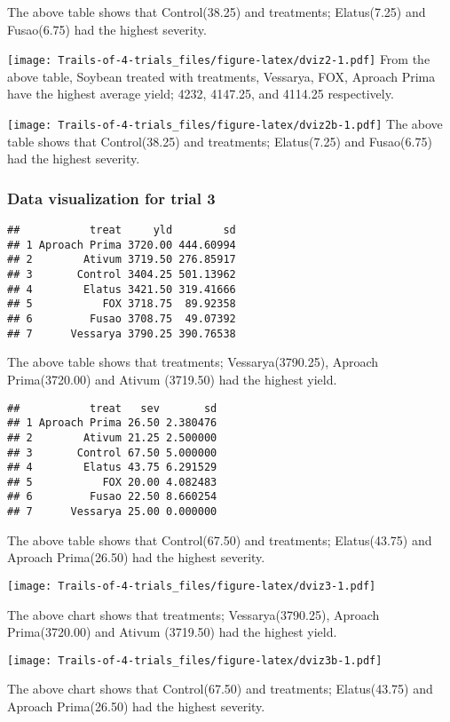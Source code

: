\documentclass[
]{article}
\begin{document}
The above table shows that Control(38.25) and treatments; Elatus(7.25)
and Fusao(6.75) had the highest severity.

\texttt{[image: Trails-of-4-trials\_files/figure-latex/dviz2-1.pdf]} From
the above table, Soybean treated with treatments, Vessarya, FOX, Aproach
Prima have the highest average yield; 4232, 4147.25, and 4114.25
respectively.

\texttt{[image: Trails-of-4-trials\_files/figure-latex/dviz2b-1.pdf]} The
above table shows that Control(38.25) and treatments; Elatus(7.25) and
Fusao(6.75) had the highest severity.

\hypertarget{data-visualization-for-trial-3}{%
\subsubsection{Data visualization for trial
3}\label{data-visualization-for-trial-3}}

\begin{verbatim}
##           treat     yld        sd
## 1 Aproach Prima 3720.00 444.60994
## 2        Ativum 3719.50 276.85917
## 3       Control 3404.25 501.13962
## 4        Elatus 3421.50 319.41666
## 5           FOX 3718.75  89.92358
## 6         Fusao 3708.75  49.07392
## 7      Vessarya 3790.25 390.76538
\end{verbatim}

The above table shows that treatments; Vessarya(3790.25), Aproach
Prima(3720.00) and Ativum (3719.50) had the highest yield.

\begin{verbatim}
##           treat   sev       sd
## 1 Aproach Prima 26.50 2.380476
## 2        Ativum 21.25 2.500000
## 3       Control 67.50 5.000000
## 4        Elatus 43.75 6.291529
## 5           FOX 20.00 4.082483
## 6         Fusao 22.50 8.660254
## 7      Vessarya 25.00 0.000000
\end{verbatim}

The above table shows that Control(67.50) and treatments; Elatus(43.75)
and Aproach Prima(26.50) had the highest severity.

\texttt{[image: Trails-of-4-trials\_files/figure-latex/dviz3-1.pdf]}

The above chart shows that treatments; Vessarya(3790.25), Aproach
Prima(3720.00) and Ativum (3719.50) had the highest yield.

\texttt{[image: Trails-of-4-trials\_files/figure-latex/dviz3b-1.pdf]}

The above chart shows that Control(67.50) and treatments; Elatus(43.75)
and Aproach Prima(26.50) had the highest severity.
\end{document}
